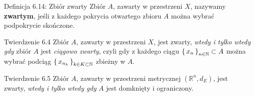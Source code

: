 \documentclass{article}
\newcommand{\R}{\mathbb{R}}
\newcommand{\N}{\mathbb{N}}
\newcommand{\seq}[1]{\set{#1_n}_{n\in\N}}
\begin{document}
\begin{defr}{Definicja 6.14: Zbiór zwarty}
    Zbiór $A$, zawarty w przestrzeni $X$, nazywamy \textbf{zwartym}, jeśli z każdego pokrycia otwartego zbioru $A$ można
    wybrać podpokrycie skończone.
\end{defr}

\begin{twier}{Twierdzenie 6.4}
    Zbiór $A$, zawarty w przestrzeni $X$, jest zwarty, \textit{wtedy i tylko wtedy gdy} zbiór $A$ jest \textit{ciągowo zwarty}, czyli
    gdy z każdego ciągu $\seq{x}\subset A$ można wybrać podciąg $\set{x_{n_k}}_{k\in K\subset\N}$ zbieżny w $A$.
\end{twier}

\begin{twier}{Twierdzenie 6.5}
    Zbiór $A$, zawarty w przestrzeni metrycznej $(\R^n,d_E)$, jest zwarty, \textit{wtedy i tylko wtedy gdy} $A$ jest
    domknięty i ograniczony.
\end{twier}




























                                                
\end{document}

